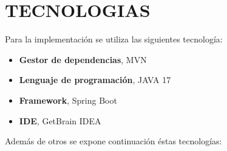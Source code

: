 \chapter*{TECNOLOGIAS}
Para la implementación se utiliza las siguientes tecnología:
\begin{itemize}
\item \textbf{Gestor de dependencias}, MVN
\item \textbf{Lenguaje de programación}, JAVA 17
\item \textbf{Framework}, Spring Boot
\item \textbf{IDE}, GetBrain IDEA
\end{itemize}
Además de otros se expone continuación éstas tecnologías:
